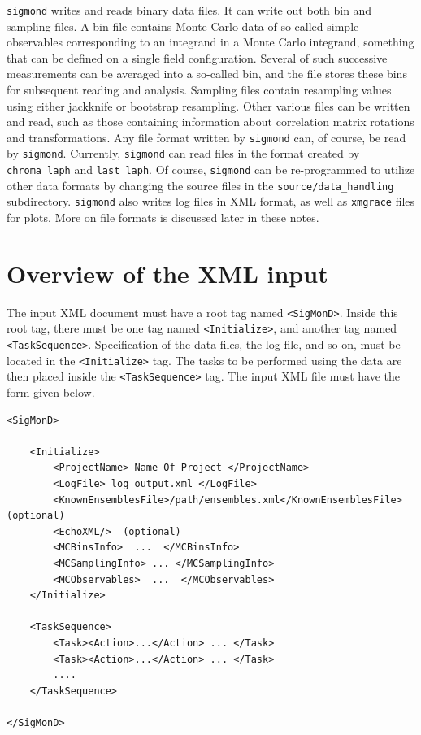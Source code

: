 \documentclass[12pt]{article}
\newcommand{\vb}{\texttt}
\begin{document}

\vb{sigmond} writes and reads binary data files.  It can write out
both bin and sampling files.  A bin file contains Monte Carlo data
of so-called simple observables corresponding to an integrand in a Monte
Carlo integrand, something that can be defined on a single field
configuration.  Several of such successive measurements can be averaged
into a so-called bin, and the file stores these bins for subsequent
reading and analysis.  Sampling files contain resampling values using
either jackknife or bootstrap resampling.  Other various files can
be written and read, such as those containing information about
correlation matrix rotations and transformations.  Any file format
written by \vb{sigmond} can, of course, be read by \vb{sigmond}.
Currently, \vb{sigmond} can read files in the format created by
\vb{chroma\_laph} and \vb{last\_laph}.  Of course, \vb{sigmond} can be
re-programmed to utilize other data formats by changing the source files
in the \vb{source/data\_handling} subdirectory. \vb{sigmond} also writes
log files in XML format, as well as \vb{xmgrace} files for plots.
More on file formats is discussed later in these notes.

\section{Overview of the XML input}
The input XML document must have a root tag named \vb{<SigMonD>}.
Inside this root tag, there must be one tag named \vb{<Initialize>},
and another tag named \vb{<TaskSequence>}.  Specification of the data
files, the log file, and so on, must be located in the \vb{<Initialize>}
tag.  The tasks to be performed using the data are then placed inside
the \vb{<TaskSequence>} tag.   The input XML file must have the form
given below.

\begin{verbatim}
<SigMonD>

    <Initialize>
        <ProjectName> Name Of Project </ProjectName>
        <LogFile> log_output.xml </LogFile>
        <KnownEnsemblesFile>/path/ensembles.xml</KnownEnsemblesFile> (optional)
        <EchoXML/>  (optional)
        <MCBinsInfo>  ...  </MCBinsInfo>
        <MCSamplingInfo> ... </MCSamplingInfo>
        <MCObservables>  ...  </MCObservables>
    </Initialize>

    <TaskSequence>
        <Task><Action>...</Action> ... </Task>
        <Task><Action>...</Action> ... </Task>
        ....
    </TaskSequence>

</SigMonD>
\end{verbatim}
\end{document}
